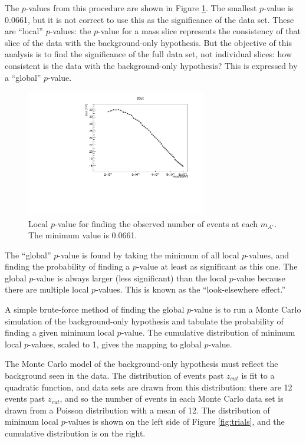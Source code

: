 The $p$-values from this procedure are shown in Figure \ref{fig:pval}.
The smallest $p$-value is 0.0661, but it is not correct to use this as the significance of the data set.
These are ``local'' $p$-values: the $p$-value for a mass slice represents the consistency of that slice of the data with the background-only hypothesis.
But the objective of this analysis is to find the significance of the full data set, not individual slices: how consistent is the data with the background-only hypothesis?
This is expressed by a ``global'' $p$-value.
\begin{figure}[ht]
\begin{center}
    \includegraphics[width=0.7\textwidth,page=12,angle=-90]{vertexing/figs/golden_mres_output}
\end{center}
\caption{Local $p$-value for finding the observed number of events at each $m_{A'}$. The minimum value is 0.0661.}
    \label{fig:pval}
\end{figure}


The ``global'' $p$-value is found by taking the minimum of all local $p$-values, and finding the probability of finding a $p$-value at least as significant as this one.
The global $p$-value is always larger (less significant) than the local $p$-value because there are multiple local $p$-values.
This is known as the ``look-elsewhere effect.''

A simple brute-force method of finding the global $p$-value is to run a Monte Carlo simulation of the background-only hypothesis and tabulate the probability of finding a given minimum local $p$-value.
The cumulative distribution of minimum local $p$-values, scaled to 1, gives the mapping to global $p$-value.

The Monte Carlo model of the background-only hypothesis must reflect the background seen in the data.
The distribution of events past $z_{cut}$ is fit to a quadratic function, and data sets are drawn from this distribution: there are 12 events past $z_{cut}$, and so the number of events in each Monte Carlo data set is drawn from a Poisson distribution with a mean of 12.
The distribution of minimum local $p$-values is shown on the left side of Figure \ref{fig:trials}, and the cumulative distribution is on the right.

